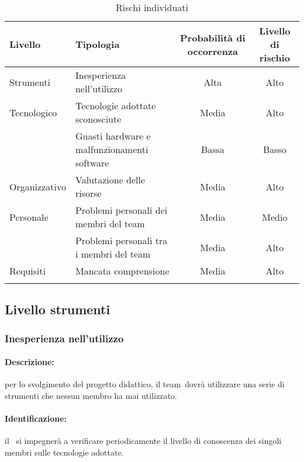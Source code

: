 \documentclass[../PianoProgetto.tex]{subfiles}
\begin{document}
	\begin{table}[h]
		\centering
		
		\begin{tabularx}{\textwidth}{X X C C}
			\toprule
			\textbf{Livello} 	& \textbf{Tipologia} 						& \textbf{Probabilità di occorrenza} & \textbf{Livello di rischio} \\
			\midrule
			Strumenti 	& Inesperienza nell'utilizzo 				& Alta 	& Alto \\
			\midrule
			Tecnologico	& Tecnologie adottate sconosciute 			& Media 	& Alto \\
					& Guasti hardware e malfunzionamenti software\g\ 	& Bassa 	& Basso \\
			\midrule
			Organizzativo& Valutazione delle risorse					& Media	& Alto \\
			\midrule
			Personale	& Problemi personali dei membri del team\g\ & Media	& Medio \\
					& Problemi personali tra i membri del team\g\ 	& Media	& Alto \\
			\midrule
			Requisiti	& Mancata comprensione					& Media	& Alto \\
			\bottomrule
		\end{tabularx}
		
		\caption{Rischi individuati}
		\label{tab:rischi}
		
	\end{table}


\subsection{Livello strumenti}

\subsubsection{Inesperienza nell'utilizzo}

	\paragraph*{Descrizione:} per lo svolgimento del progetto didattico, il team\g\ dovrà utilizzare una serie di strumenti che nessun membro ha mai utilizzato.
	
	\paragraph*{Identificazione:} il \responsabilediprogetto\ si impegnerà a verificare periodicamente il livello di conoscenza dei singoli membri sulle tecnologie adottate.
	
\end{document}
